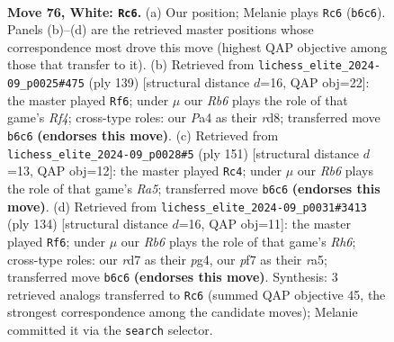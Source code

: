 \documentclass[11pt]{article}
\begin{document}
\clearpage

\begin{figure}[p]\centering
\begin{subfigure}{0.46\textwidth}\centering
\resizebox{\linewidth}{!}{%
\newchessgame
\chessboard[
  setfen={R7/3r1p2/1R2p3/6k1/P3P3/5P2/6K1/8 w - - 43 76},
  showmover=false,
  pgfstyle=straightmove, color=movearrow, markmove={b6-c6}
]}
\caption{}
\end{subfigure}\hfill
\begin{subfigure}{0.46\textwidth}\centering
\resizebox{\linewidth}{!}{%
\newchessgame
\chessboard[
  setfen={3R4/8/7k/5r1p/6p1/6P1/5PK1/8 b - - 33 70},
  showmover=false,
  pgfstyle=straightmove, color=movearrow, markmove={f5-f6}
]}
\caption{}
\end{subfigure}
\\[4pt]
\begin{subfigure}{0.46\textwidth}\centering
\resizebox{\linewidth}{!}{%
\newchessgame
\chessboard[
  setfen={8/4k3/1p2p3/p3P1K1/r4P2/8/8/7R b - - 3 76},
  showmover=false,
  pgfstyle=straightmove, color=movearrow, markmove={a4-c4}
]}
\caption{}
\end{subfigure}\hfill
\begin{subfigure}{0.46\textwidth}\centering
\resizebox{\linewidth}{!}{%
\newchessgame
\chessboard[
  setfen={8/2k5/7R/r6p/6p1/6P1/5PK1/8 w - - 14 68},
  showmover=false,
  pgfstyle=straightmove, color=movearrow, markmove={h6-f6}
]}
\caption{}
\end{subfigure}
\caption{\textbf{Move 76, White: \texttt{Rc6}.} (a) Our position; Melanie plays \texttt{Rc6} (\texttt{b6c6}). Panels (b)--(d) are the retrieved master positions whose correspondence most drove this move (highest QAP objective among those that transfer to it). (b) Retrieved from \texttt{lichess\_elite\_2024-09\_p0025\#475} (ply 139) [structural distance $d$=16, QAP obj=22]: the master played \texttt{Rf6}; under $\mu$ our \emph{Rb6} plays the role of that game's \emph{Rf4}; cross-type roles: our \emph{P}a4 as their \emph{r}d8; transferred move \texttt{b6c6} \textbf{(endorses this move)}. (c) Retrieved from \texttt{lichess\_elite\_2024-09\_p0028\#5} (ply 151) [structural distance $d$=13, QAP obj=12]: the master played \texttt{Rc4}; under $\mu$ our \emph{Rb6} plays the role of that game's \emph{Ra5}; transferred move \texttt{b6c6} \textbf{(endorses this move)}. (d) Retrieved from \texttt{lichess\_elite\_2024-09\_p0031\#3413} (ply 134) [structural distance $d$=16, QAP obj=11]: the master played \texttt{Rf6}; under $\mu$ our \emph{Rb6} plays the role of that game's \emph{Rh6}; cross-type roles: our \emph{r}d7 as their \emph{p}g4, our \emph{p}f7 as their \emph{r}a5; transferred move \texttt{b6c6} \textbf{(endorses this move)}. Synthesis: 3 retrieved analogs transferred to \texttt{Rc6} (summed QAP objective 45, the strongest correspondence among the candidate moves); Melanie committed it via the \texttt{search} selector.}
\label{fig:thought-m150}
\end{figure}
\end{document}
